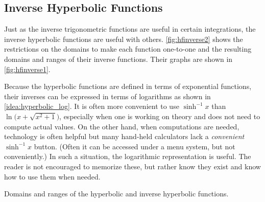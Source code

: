 \subsection{Inverse Hyperbolic Functions}

Just as the inverse trigonometric functions are useful in certain integrations, the inverse hyperbolic functions are useful with others. \autoref{fig:hfinverse2} shows the restrictions on the domains to make each function one-to-one and the resulting domains and ranges of their inverse functions. Their graphs are shown in \autoref{fig:hfinverse1}.

Because the hyperbolic functions are defined in terms of exponential functions, their inverses can be expressed in terms of logarithms as shown in \autoref{idea:hyperbolic_log}. It is often more convenient to use $\sinh^{-1}x$ than $\ln\bigl(x+\sqrt{x^2+1}\bigr)$, especially when one is working on theory and does not need to compute actual values. On the other hand, when computations are needed, technology is often helpful but many hand-held calculators lack a \emph{convenient} $\sinh^{-1}x$ button. (Often it can be accessed under a menu system, but not conveniently.) In such a situation, the logarithmic representation is useful. The reader is not encouraged to memorize these, but rather know they exist and know how to use them when needed.

\noindent\begin{minipage}[t]{\linewidth}\noindent%
\captionsetup{type=figure}%
\flushinner{%
\small
\tagpdfsetup{table/header-rows={1}}
\begin{tabular}{ l c c @{\hspace{2em}} c c c }
Function & Domain & Range & Function & Domain & Range \\ \cmidrule(r{2em}){1-3} \cmidrule(l{-1em}){4-6}
$\cosh x$ & $[0,\infty)$ & $[1,\infty)$ &
 $\cosh^{-1} x$ & $[1,\infty)$ & $[0,\infty)$ \\
$\sinh x$ & $(-\infty,\infty)$ & $(-\infty,\infty)$ &
 $\sinh^{-1} x$ & $(-\infty,\infty)$ & $(-\infty,\infty)$\\
$\tanh x$ & $(-\infty,\infty)$ & $(-1,1)$ &
 $\tanh^{-1} x$ & $(-1,1)$ & $(-\infty,\infty)$\\
$\sech x$ & $[0,\infty)$ & $(0,1]$ & $\sech^{-1} x$ & $(0,1]$ & $[0,\infty)$\\
$\csch x$ & $(-\infty,0) \cup (0,\infty)$ & $(-\infty,0) \cup (0,\infty)$ &
 $\csch^{-1} x$ & $(-\infty,0) \cup (0,\infty)$ & $(-\infty,0) \cup (0,\infty)$\\
$\coth x$ & $(-\infty,0) \cup (0,\infty)$ & $(-\infty,-1) \cup (1,\infty)$ &
 $\coth^{-1} x$ & $(-\infty,-1) \cup (1,\infty)$ & $(-\infty,0) \cup (0,\infty)$
\end{tabular}}
\caption{Domains and ranges of the hyperbolic and inverse hyperbolic functions.}
\label{fig:hfinverse2}\tagstructend
\end{minipage}

